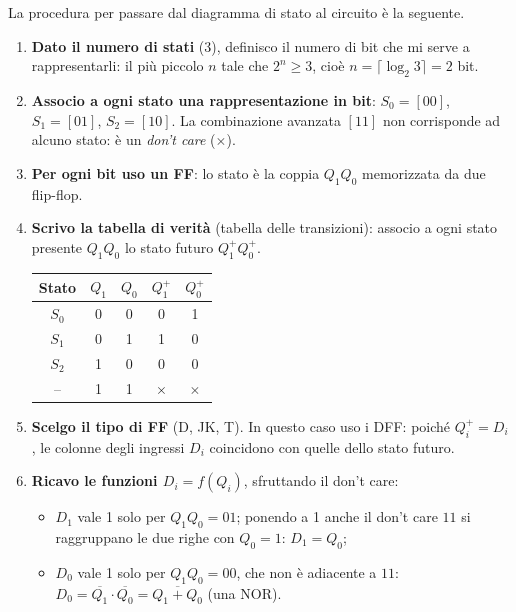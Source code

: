 \noindent La procedura per passare dal diagramma di stato al circuito è la seguente.

\begin{enumerate}[leftmargin=1.8em, itemsep=4pt, label=\textbf{\arabic*)}]
    \item \textbf{Dato il numero di stati} (3), definisco il numero di bit che mi serve a
          rappresentarli: il più piccolo $n$ tale che $2^n \ge 3$, cioè
          $n = \lceil \log_2 3 \rceil = 2$ bit.
    \item \textbf{Associo a ogni stato una rappresentazione in bit}:
          $S_0=[00]$, $S_1=[01]$, $S_2=[10]$. La combinazione avanzata $[11]$ non
          corrisponde ad alcuno stato: è un \emph{don't care} ($\times$).
    \item \textbf{Per ogni bit uso un FF}: lo stato è la coppia $Q_1Q_0$ memorizzata da due
          flip-flop.
    \item \textbf{Scrivo la tabella di verità} (tabella delle transizioni): associo a ogni
          stato presente $Q_1Q_0$ lo stato futuro $Q_1^+Q_0^+$.
\begin{center}
\begin{tabular}{c|cc|cc}
\toprule
Stato & $Q_1$ & $Q_0$ & $Q_1^+$ & $Q_0^+$ \\
\midrule
$S_0$ & 0 & 0 & 0 & 1 \\
$S_1$ & 0 & 1 & 1 & 0 \\
$S_2$ & 1 & 0 & 0 & 0 \\
--    & 1 & 1 & $\times$ & $\times$ \\
\bottomrule
\end{tabular}
\end{center}
    \item \textbf{Scelgo il tipo di FF} (D, JK, T). In questo caso uso i DFF: poiché
          $Q_i^+ = D_i$, le colonne degli ingressi $D_i$ coincidono con quelle dello stato
          futuro.
    \item \textbf{Ricavo le funzioni $D_i = f(Q_i)$}, sfruttando il don't care:
          \begin{itemize}[leftmargin=1.2em]
              \item $D_1$ vale 1 solo per $Q_1Q_0=01$; ponendo a 1 anche il don't care $11$
                    si raggruppano le due righe con $Q_0=1$: $D_1 = Q_0$;
              \item $D_0$ vale 1 solo per $Q_1Q_0=00$, che non è adiacente a $11$:
                    $D_0 = \overline{Q_1}\cdot\overline{Q_0} = \overline{Q_1+Q_0}$ (una NOR).
          \end{itemize}

\end{enumerate}
